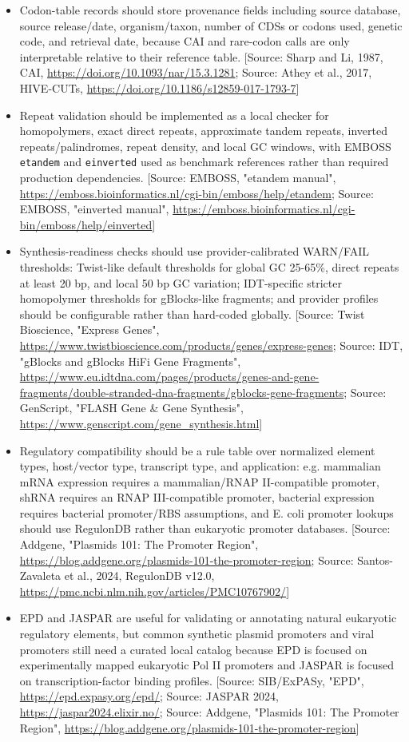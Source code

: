 \documentclass[11pt]{report}
\begin{document}
\begin{itemize}
\item Codon-table records should store provenance fields including source database, source release/date, organism/taxon, number of CDSs or codons used, genetic code, and retrieval date, because CAI and rare-codon calls are only interpretable relative to their reference table. [Source: Sharp and Li, 1987, CAI, \url{https://doi.org/10.1093/nar/15.3.1281}; Source: Athey et al., 2017, HIVE-CUTs, \url{https://doi.org/10.1186/s12859-017-1793-7}]
\item Repeat validation should be implemented as a local checker for homopolymers, exact direct repeats, approximate tandem repeats, inverted repeats/palindromes, repeat density, and local GC windows, with EMBOSS \texttt{etandem} and \texttt{einverted} used as benchmark references rather than required production dependencies. [Source: EMBOSS, "etandem manual", \url{https://emboss.bioinformatics.nl/cgi-bin/emboss/help/etandem}; Source: EMBOSS, "einverted manual", \url{https://emboss.bioinformatics.nl/cgi-bin/emboss/help/einverted}]
\item Synthesis-readiness checks should use provider-calibrated WARN/FAIL thresholds: Twist-like default thresholds for global GC 25-65\%, direct repeats at least 20 bp, and local 50 bp GC variation; IDT-specific stricter homopolymer thresholds for gBlocks-like fragments; and provider profiles should be configurable rather than hard-coded globally. [Source: Twist Bioscience, "Express Genes", \url{https://www.twistbioscience.com/products/genes/express-genes}; Source: IDT, "gBlocks and gBlocks HiFi Gene Fragments", \url{https://www.eu.idtdna.com/pages/products/genes-and-gene-fragments/double-stranded-dna-fragments/gblocks-gene-fragments}; Source: GenScript, "FLASH Gene \& Gene Synthesis", \url{https://www.genscript.com/gene_synthesis.html}]
\item Regulatory compatibility should be a rule table over normalized element types, host/vector type, transcript type, and application: e.g. mammalian mRNA expression requires a mammalian/RNAP II-compatible promoter, shRNA requires an RNAP III-compatible promoter, bacterial expression requires bacterial promoter/RBS assumptions, and E. coli promoter lookups should use RegulonDB rather than eukaryotic promoter databases. [Source: Addgene, "Plasmids 101: The Promoter Region", \url{https://blog.addgene.org/plasmids-101-the-promoter-region}; Source: Santos-Zavaleta et al., 2024, RegulonDB v12.0, \url{https://pmc.ncbi.nlm.nih.gov/articles/PMC10767902/}]
\item EPD and JASPAR are useful for validating or annotating natural eukaryotic regulatory elements, but common synthetic plasmid promoters and viral promoters still need a curated local catalog because EPD is focused on experimentally mapped eukaryotic Pol II promoters and JASPAR is focused on transcription-factor binding profiles. [Source: SIB/ExPASy, "EPD", \url{https://epd.expasy.org/epd/}; Source: JASPAR 2024, \url{https://jaspar2024.elixir.no/}; Source: Addgene, "Plasmids 101: The Promoter Region", \url{https://blog.addgene.org/plasmids-101-the-promoter-region}]

\end{itemize}
\end{document}
